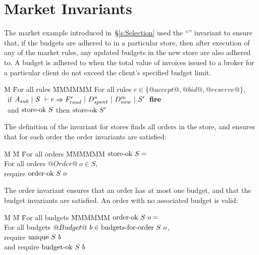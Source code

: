 \eject
\section{Market Invariants}

The market example introduced in~\S\ref{s:Selection} used the ``'' invariant to ensure that, if the budgets are adhered to in a particular store, then after execution of any of the market rules, any updated budgets in the new store are also adhered to.
A budget is adhered to when the total value of invoices issued to a broker for a particular client do not exceed the client's specified budget limit.

\begin{tabbing}
M \= For all rules \= MMMMMM \kill
\> For all rules \> $r \in \{@accept@, @bid@, @reserve@\}$, \\
\> ~if   \> $A_{sub}~|~S~\vdash r \Rightarrow F_{read}^r~|~D_{spent}^n~|~D_{new}^m~|~S'~~\textbf{fire}$ \\
\> ~and \> $\textrm{store-ok}~{S}$ \hspace{1ex} then \hspace{1ex} $\textrm{store-ok}~{S'}$
\end{tabbing}

The definition of the invariant for stores finds all orders in the store, and ensures that for each order the order invariants are satisfied:

\begin{tabbing}
M \= M \= For all orders \= MMMMMM \kill
\> $\textrm{store-ok}~{S} = $ \\
\> \> For all orders \> $@Order@~o \in S$, \\
\> \> require \> $\textrm{order-ok}~{S}~o$
\end{tabbing}

The order invariant ensures that an order has at most one budget, and that the budget invariants are satisfied. An order with no associated budget is valid:

\begin{tabbing}
M \= M \= For all budgets \= MMMMMM \kill
\> $\textrm{order-ok}~{S}~o = $ \\
\> \> For all budgets \> $@Budget@~b \in \textrm{budgets-for-order}~S~o$, \\
\> \> require \> $\textrm{unique}~S~b$ \\
\> \> and require \> $\textrm{budget-ok}~{S}~b$
\end{tabbing}

